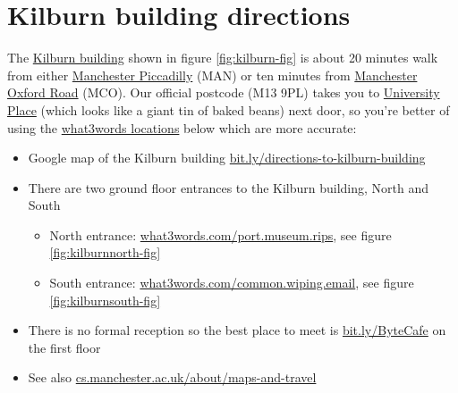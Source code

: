 \documentclass[
  12pt,
]{book}
\providecommand{\tightlist}{%
  \setlength{\itemsep}{0pt}\setlength{\parskip}{0pt}}
\begin{document}
\hypertarget{kilburn}{%
\section{Kilburn building directions}\label{kilburn}}

The \href{https://en.wikipedia.org/wiki/Kilburn_Building}{Kilburn building} shown in figure \ref{fig:kilburn-fig} is about 20 minutes walk from either \href{https://www.nationalrail.co.uk/stations_destinations/man.aspx}{Manchester Piccadilly} (MAN) or ten minutes from \href{https://www.nationalrail.co.uk/stations/mco/details.aspx}{Manchester Oxford Road} (MCO). Our official postcode (M13 9PL) takes you to \href{http://www.conference.manchester.ac.uk/venues/search/details/?property=10}{University Place} (which looks like a giant tin of baked beans) next door, so you're better of using the \href{https://www.bbc.co.uk/news/uk-england-49319760}{what3words locations} \citep{what3words} below which are more accurate:

\begin{itemize}
\tightlist
\item
  Google map of the Kilburn building \href{http://bit.ly/directions-to-kilburn-building}{bit.ly/directions-to-kilburn-building}
\item
  There are two ground floor entrances to the Kilburn building, North and South

  \begin{itemize}
  \tightlist
  \item
    North entrance: \href{https://what3words.com/port.museum.rips}{what3words.com/port.museum.rips}, see figure \ref{fig:kilburnnorth-fig}
  \item
    South entrance: \href{https://what3words.com/common.wiping.email}{what3words.com/common.wiping.email}, see figure \ref{fig:kilburnsouth-fig}
  \end{itemize}
\item
  There is no formal reception so the best place to meet is \href{http://bit.ly/ByteCafe}{bit.ly/ByteCafe} on the first floor
\item
  See also \href{https://www.cs.manchester.ac.uk/about/maps-and-travel/}{cs.manchester.ac.uk/about/maps-and-travel}
\end{itemize}
\end{document}
